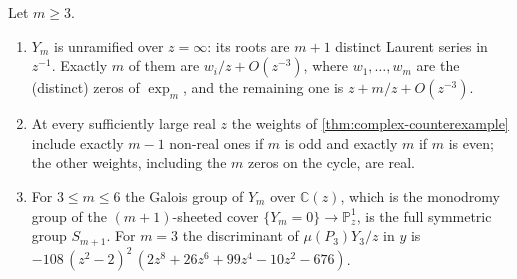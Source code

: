 \documentclass[final]{siamart0516}
\numberwithin{theorem}{section}
\numberwithin{equation}{section}
\theoremstyle{siamnonum}
\theoremstyle{plain}
\newcommand{\CC}{\mathbb{C}}
\begin{document}
\begin{proposition}\label{prop:Ym-arithmetic}
Let $m\ge3$.
\begin{enumerate}[label=\textup{(\arabic*)}]
\item $Y_m$ is unramified over $z=\infty$: its roots are $m+1$ distinct Laurent series in $z^{-1}$. Exactly $m$ of them are $w_i/z+O(z^{-3})$, where $w_1,\dots,w_m$ are the \textup{(}distinct\textup{)} zeros of $\exp_m$, and the remaining one is $z+m/z+O(z^{-3})$.
\item At every sufficiently large real $z$ the weights of \cref{thm:complex-counterexample} include exactly $m-1$ non-real ones if $m$ is odd and exactly $m$ if $m$ is even; the other weights, including the $m$ zeros on the cycle, are real.
\item For $3\le m\le6$ the Galois group of $Y_m$ over $\CC(z)$, which is the monodromy group of the $(m+1)$-sheeted cover $\{Y_m=0\}\to\mathbb P^{1}_z$, is the full symmetric group $S_{m+1}$. For $m=3$ the discriminant of $\mu(P_3)Y_3/z$ in $y$ is $-108\,(z^{2}-2)^{2}\,(2z^{8}+26z^{6}+99z^{4}-10z^{2}-676)$.
\end{enumerate}
\end{proposition}
\end{document}
